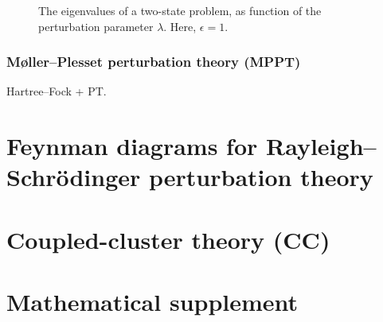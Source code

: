 \documentclass{report}
\theoremstyle{plain}
\theoremstyle{definition}
\begin{document}
\begin{figure}
  \begin{center}
  \end{center}
  \caption{The eigenvalues of a two-state problem, as function of the
    perturbation parameter $\lambda$. Here, $\epsilon =
    1$.\label{fig:twostate}}
\end{figure}






\subsection{M{\o}ller--Plesset perturbation theory (MPPT)}
\label{sec:mppt}

Hartree--Fock + PT.

\chapter{Feynman diagrams for Rayleigh--Schr\"odinger perturbation
  theory}
\label{sec:feynman}


\chapter{Coupled-cluster theory (CC)}
\label{sec:cc}




\appendix
\chapter{Mathematical supplement}
\label{ch:mathematical-supplement}




%





\end{document}

